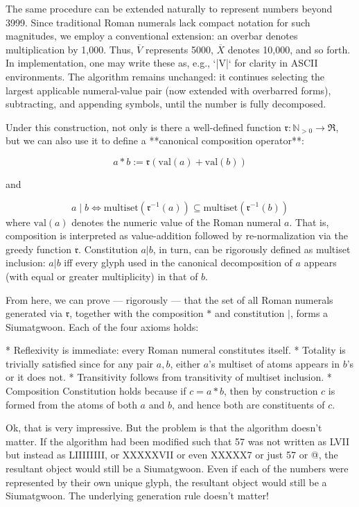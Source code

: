 The same procedure can be extended naturally to represent numbers beyond 3999. Since traditional Roman numerals lack compact notation for such magnitudes, we employ a conventional extension: an overbar denotes multiplication by 1,000. Thus, $\overline{V}$ represents 5000, $\overline{X}$ denotes 10,000, and so forth. In implementation, one may write these as, e.g., `|V|` for clarity in ASCII environments. The algorithm remains unchanged: it continues selecting the largest applicable numeral-value pair (now extended with overbarred forms), subtracting, and appending symbols, until the number is fully decomposed.

Under this construction, not only is there a well-defined function $\mathfrak{r} : \mathbb{N}_{>0} \rightarrow \mathfrak{R}$, but we can also use it to define a **canonical composition operator**:

$$
a * b := \mathfrak{r}(\mathrm{val}(a) + \mathrm{val}(b))
$$

and 

$$a \mid b \iff \text{multiset}(\mathfrak{r}^{-1}(a)) \subseteq \text{multiset}(\mathfrak{r}^{-1}(b))$$
where $\mathrm{val}(a)$ denotes the numeric value of the Roman numeral $a$. That is, composition is interpreted as value-addition followed by re-normalization via the greedy function $\mathfrak{r}$. Constitution $a | b$, in turn, can be rigorously defined as multiset inclusion: $a | b$ iff every glyph used in the canonical decomposition of $a$ appears (with equal or greater multiplicity) in that of $b$.

From here, we can prove — rigorously — that the set of all Roman numerals generated via $\mathfrak{r}$, together with the composition $*$ and constitution $|$, forms a Siumatgwoon. Each of the four axioms holds:

* Reflexivity is immediate: every Roman numeral constitutes itself.
* Totality is trivially satisfied since for any pair $a, b$, either $a$’s multiset of atoms appears in $b$’s or it does not.
* Transitivity follows from transitivity of multiset inclusion.
* Composition Constitution holds because if $c = a * b$, then by construction $c$ is formed from the atoms of both $a$ and $b$, and hence both are constituents of $c$.




Ok, that is very impressive. But the problem is that the algorithm doesn't matter. If the algorithm had been modified such that 57 was not written as LVII but instead as LIIIIIIII, or XXXXXVII or even XXXXX7 or just 57 or @, the resultant object would still be a Siumatgwoon. Even if each of the numbers were represented by their own unique glyph, the resultant object would still be a Siumatgwoon. The underlying generation rule doesn't matter!




